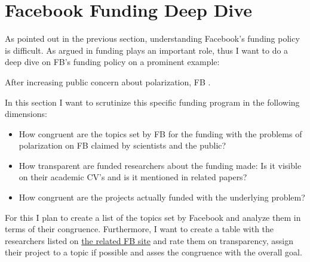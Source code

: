 \section{Facebook Funding Deep Dive}
\label{sec:fac_fund}

As pointed out in the previous section, understanding Facebook's funding policy is difficult. As argued in \citep{abdalla_grey_2021} funding plays an important role, thus I want to do a deep dive on FB's funding policy on a prominent example:

After increasing public concern about polarization, FB  \citep{seetharaman_facebook_2020}. 

In this section I want to scrutinize this specific funding program in the following dimensions:
\begin{itemize}
    \item How congruent are the topics set by FB for the funding with the problems of polarization on FB claimed by scientists and the public?
    \item How transparent are funded researchers about the funding made: Is it visible on their academic CV's and is it mentioned in related papers?
    \item How congruent are the projects actually funded with the underlying problem?
\end{itemize}

For this I plan to create a list of the topics set by Facebook  and analyze them in terms of their congruence.
Furthermore, I want to create a table with the researchers listed on \href{https://research.fb.com/programs/research-awards/proposals/foundational-integrity-research-misinformation-and-polarization-request-for-proposals/}{the related FB site} and rate them on transparency, assign their project to a topic if possible and asses the congruence with the overall goal.

